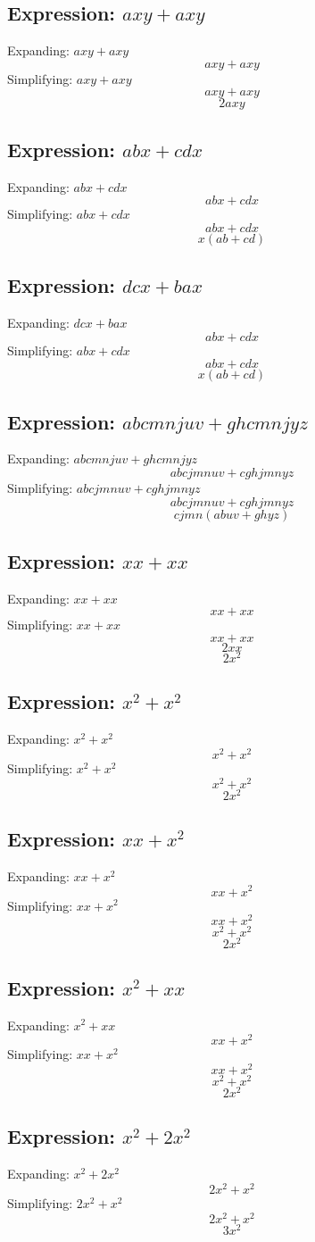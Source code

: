 \documentclass[10pt]{article}
\begin{document}
\subsection*{Expression: $axy + axy$}
Expanding: $axy + axy$
$$axy + axy$$
Simplifying: $axy + axy$
$$axy + axy$$
$$2axy$$
\subsection*{Expression: $abx + cdx$}
Expanding: $abx + cdx$
$$abx + cdx$$
Simplifying: $abx + cdx$
$$abx + cdx$$
$$x(ab + cd)$$
\subsection*{Expression: $dcx + bax$}
Expanding: $dcx + bax$
$$abx + cdx$$
Simplifying: $abx + cdx$
$$abx + cdx$$
$$x(ab + cd)$$
\subsection*{Expression: $abcmnjuv + ghcmnjyz$}
Expanding: $abcmnjuv + ghcmnjyz$
$$abcjmnuv + cghjmnyz$$
Simplifying: $abcjmnuv + cghjmnyz$
$$abcjmnuv + cghjmnyz$$
$$cjmn(abuv + ghyz)$$
\subsection*{Expression: $xx + xx$}
Expanding: $xx + xx$
$$xx + xx$$
Simplifying: $xx + xx$
$$xx + xx$$
$$2xx$$
$$2x^{2}$$
\subsection*{Expression: $x^{2} + x^{2}$}
Expanding: $x^{2} + x^{2}$
$$x^{2} + x^{2}$$
Simplifying: $x^{2} + x^{2}$
$$x^{2} + x^{2}$$
$$2x^{2}$$
\subsection*{Expression: $xx + x^{2}$}
Expanding: $xx + x^{2}$
$$xx + x^{2}$$
Simplifying: $xx + x^{2}$
$$xx + x^{2}$$
$$x^{2} + x^{2}$$
$$2x^{2}$$
\subsection*{Expression: $x^{2} + xx$}
Expanding: $x^{2} + xx$
$$xx + x^{2}$$
Simplifying: $xx + x^{2}$
$$xx + x^{2}$$
$$x^{2} + x^{2}$$
$$2x^{2}$$
\subsection*{Expression: $x^{2} + 2x^{2}$}
Expanding: $x^{2} + 2x^{2}$
$$2x^{2} + x^{2}$$
Simplifying: $2x^{2} + x^{2}$
$$2x^{2} + x^{2}$$
$$3x^{2}$$
\end{document}
